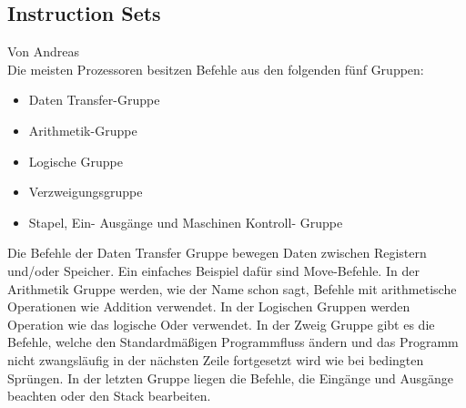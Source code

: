 \documentclass[12pt]{article}
\begin{document}
\subsection{Instruction Sets}
Von Andreas\\
Die meisten Prozessoren besitzen Befehle aus den folgenden fünf Gruppen:

\begin{itemize}
\item Daten Transfer-Gruppe
\item Arithmetik-Gruppe
\item Logische Gruppe
\item Verzweigungsgruppe
\item Stapel, Ein- Ausgänge und Maschinen Kontroll- Gruppe
\end{itemize}

\noindent
Die Befehle der Daten Transfer Gruppe bewegen Daten zwischen Registern und/oder Speicher. Ein einfaches Beispiel dafür sind Move-Befehle. In der Arithmetik Gruppe werden, wie der Name schon sagt, Befehle mit arithmetische Operationen wie Addition verwendet. In der Logischen Gruppen werden Operation wie das logische Oder verwendet. In der Zweig Gruppe gibt es die Befehle, welche den Standardmäßigen Programmfluss ändern und das Programm nicht zwangsläufig in der nächsten Zeile fortgesetzt wird wie bei bedingten Sprüngen. In der letzten Gruppe liegen die Befehle, die Eingänge und Ausgänge beachten oder den Stack bearbeiten. \cite{IntMan45}
\\

\newpage
\end{document}
